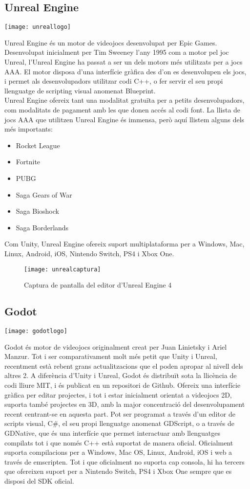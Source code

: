 \subsection{Unreal Engine}
\begin{center}
  \texttt{[image: unreallogo]}
\end{center}
Unreal Engine és un motor de videojocs desenvolupat per Epic Games. Desenvolupat inicialment per Tim Sweeney l'any 1995 com a motor pel joc Unreal, l'Unreal Engine ha passat a ser un dels motors més utilitzats per a jocs AAA.
El motor disposa d'una interfície gràfica des d'on es desenvolupen els jocs, i permet als desenvolupadors utilitzar codi C++, o fer servir el seu propi llenguatge de scripting visual anomenat Blueprint.
\\
Unreal Engine ofereix tant una modalitat gratuïta per a petits desenvolupadors, com modalitats de pagament amb les que donen accés al codi font.
La llista de jocs AAA que utilitzen Unreal Engine és immensa, però aquí llistem alguns dels més importants:
\begin{itemize}
  \item Rocket League
  \item Fortnite
  \item PUBG
  \item Saga Gears of War
  \item Saga Bioshock
  \item Saga Borderlands
\end{itemize}

Com Unity, Unreal Engine ofereix suport multiplataforma per a Windows, Mac, Linux, Android, iOS, Nintendo Switch, PS4 i Xbox One.
\begin{figure}[h]
  \texttt{[image: unrealcaptura]}
  \caption{Captura de pantalla del editor d'Unreal Engine 4}
\end{figure}
\subsection{Godot}
\begin{center}
  \texttt{[image: godotlogo]}
\end{center}
Godot és motor de videojocs originalment creat per Juan Linietsky i Ariel Manzur. Tot i ser comparativament molt més petit que Unity i Unreal, recentment està rebent grans actualitzacions que el poden apropar al nivell dels altres 2.
A diferència d'Unity i Unreal, Godot és distribuït sota la llicència de codi lliure MIT, i és publicat en un repositori de Github.
Ofereix una interfície gràfica per editar projectes, i tot i estar inicialment orientat a videojocs 2D, suporta també projectes en 3D, amb la major concentració del desenvolupament recent centrant-se en aquesta part.
Pot ser programat a través d'un editor de scripts visual, C#, el seu propi llenguatge anomenat GDScript, o a través de GDNative, que és una interfície que permet interactuar amb llenguatges compilats tot i que només C++ està suportat de manera oficial.
Oficialment suporta compilacions per a Windows, Mac OS, Linux, Android, iOS i web a través de emscripten. Tot i que oficialment no suporta cap consola, hi ha tercers que ofereixen suport per a Nintendo Switch, PS4 i Xbox One sempre que es disposi del SDK oficial.
